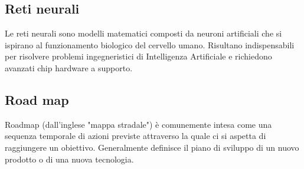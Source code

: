 \subsection*{Reti neurali}
Le reti neurali sono modelli matematici composti da neuroni artificiali che si ispirano al funzionamento biologico del cervello umano.
Risultano indispensabili per risolvere problemi ingegneristici di Intelligenza Artificiale e richiedono avanzati chip hardware a supporto.

\subsection*{Road map}
Roadmap (dall'inglese "mappa stradale") è comunemente intesa come una sequenza temporale di azioni previste attraverso la quale ci si aspetta di raggiungere un obiettivo. Generalmente definisce il piano di sviluppo di un nuovo prodotto o di una nuova tecnologia.

